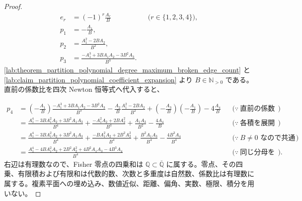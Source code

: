 \documentclass[11pt,a4paper]{article}
\theoremstyle{remark}
\begin{document}
\begin{proof}
\[\begin{aligned}
e_r&=(-1)^r\frac{A_r}{B}&&\bigl(r\in\{1,2,3,4\}\bigr),\\
p_1&=-\frac{A_1}{B},\\
p_2&=\frac{A_1^2-2BA_2}{B^2},\\
p_3&=\frac{-A_1^3+3BA_1A_2-3B^2A_3}{B^3}.
\end{aligned}\]
\cref{lab:theorem_partition_polynomial_degree_maximum_broken_edge_count}
 と
\cref{lab:claim_partition_polynomial_coefficient_expansion}
 より
$B\in\mathbb N_{>0}$
 である。直前の係数比を四次 Newton 恒等式へ代入すると、

\[\begin{aligned}
p_4
&=
\left(-\frac{A_1}{B}\right)
\frac{-A_1^3+3BA_1A_2-3B^2A_3}{B^3}
-\frac{A_2}{B}\frac{A_1^2-2BA_2}{B^2}
+\left(-\frac{A_3}{B}\right)\left(-\frac{A_1}{B}\right)
-4\frac{A_4}{B}
&&\bigl(\because\ \text{直前の係数比を代入する}\bigr)\\
&=
\frac{A_1^4-3BA_1^2A_2+3B^2A_1A_3}{B^4}
+\frac{-A_1^2A_2+2BA_2^2}{B^3}
+\frac{A_1A_3}{B^2}
-\frac{4A_4}{B}
&&\bigl(\because\ \text{各積を展開する}\bigr)\\
&=
\frac{A_1^4-3BA_1^2A_2+3B^2A_1A_3}{B^4}
+\frac{-BA_1^2A_2+2B^2A_2^2}{B^4}
+\frac{B^2A_1A_3}{B^4}
-\frac{4B^3A_4}{B^4}
&&\bigl(\because\ B\ne0\text{ なので共通分母へ移す}\bigr)\\
&=
\frac{
  A_1^4
  -4BA_1^2A_2
  +2B^2A_2^2
  +4B^2A_1A_3
  -4B^3A_4
}{B^4}
&&\bigl(\because\ \text{同じ分母をもつ項を加えて同類項をまとめる}\bigr).
\end{aligned}\]
右辺は有理数なので、Fisher 零点の四乗和は
$\mathbb Q\subset\overline{\mathbb Q}$
 に属する。零点、その四乗、有限積および有限和は代数的数、次数と多重度は自然数、係数比は有理数に属する。複素平面への埋め込み、数値近似、距離、偏角、実数、極限、積分を用いない。

\end{proof}
\end{document}
